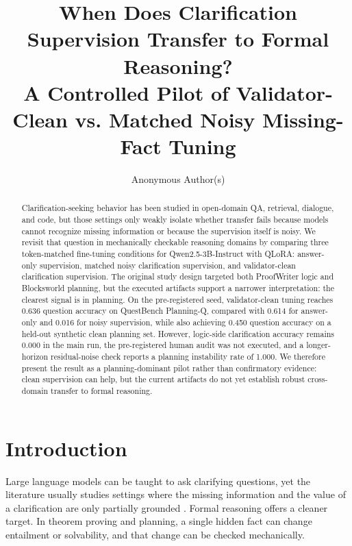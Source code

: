 \hypersetup{colorlinks=true,citecolor=blue,linkcolor=blue,urlcolor=blue}

\title{When Does Clarification Supervision Transfer to Formal Reasoning?\\A Controlled Pilot of Validator-Clean vs. Matched Noisy Missing-Fact Tuning}

\author{Anonymous Author(s)}



\maketitle

\begin{abstract}
Clarification-seeking behavior has been studied in open-domain QA, retrieval, dialogue, and code, but those settings only weakly isolate whether transfer fails because models cannot recognize missing information or because the supervision itself is noisy. We revisit that question in mechanically checkable reasoning domains by comparing three token-matched fine-tuning conditions for Qwen2.5-3B-Instruct with QLoRA: answer-only supervision, matched noisy clarification supervision, and validator-clean clarification supervision. The original study design targeted both ProofWriter logic and Blocksworld planning, but the executed artifacts support a narrower interpretation: the clearest signal is in planning. On the pre-registered seed, validator-clean tuning reaches 0.636 question accuracy on QuestBench Planning-Q, compared with 0.614 for answer-only and 0.016 for noisy supervision, while also achieving 0.450 question accuracy on a held-out synthetic clean planning set. However, logic-side clarification accuracy remains 0.000 in the main run, the pre-registered human audit was not executed, and a longer-horizon residual-noise check reports a planning instability rate of 1.000. We therefore present the result as a planning-dominant pilot rather than confirmatory evidence: clean supervision can help, but the current artifacts do not yet establish robust cross-domain transfer to formal reasoning.
\end{abstract}

\section{Introduction}
Large language models can be taught to ask clarifying questions, yet the literature usually studies settings where the missing information and the value of a clarification are only partially grounded \citep{kuhn2023clam,lee-etal-2023-asking,zhang-etal-2024-clamber,chi2024clarinet,andukuri2024stargate,wu2025clarifycoder}. Formal reasoning offers a cleaner target. In theorem proving and planning, a single hidden fact can change entailment or solvability, and that change can be checked mechanically.

